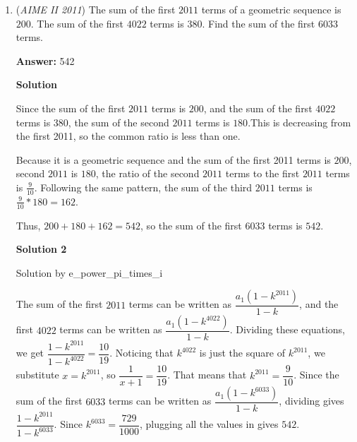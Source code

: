 \begin{enumerate}
 $\frac{AC}{CD} = \frac{AB}{BD}$ $\rightarrow$ $\frac{CD}{BD} = \frac{11}{20}$ $\rightarrow$ $\frac{BC}{BD} = \frac{31}{20}$

 So, from our Menelaus' equation: $\frac{PA}{CP} = \frac{20}{31}$ $\rightarrow$ $m + n = 20 + 31 = \boxed{051}$.

 


 


	\item (\textit{AIME II 2011}) The sum of the first $2011$ terms of a geometric sequence is $200$. The sum of the first $4022$ terms is $380$. Find the sum of the first $6033$ terms. 


 
 \textbf{Answer: }542



\textbf{Solution}

Since the sum of the first $2011$ terms is $200$, and the sum of the first $4022$ terms is $380$, the sum of the second $2011$ terms is $180$.This is decreasing from the first 2011, so the common ratio is less than one.

 Because it is a geometric sequence and the sum of the first 2011 terms is $200$, second $2011$ is $180$, the ratio of the second $2011$ terms to the first $2011$ terms is $\frac{9}{10}$. Following the same pattern, the sum of the third $2011$ terms is $\frac{9}{10}*180 = 162$.

 Thus, $200+180+162=542$, so the sum of the first $6033$ terms is $\boxed{542}$.

 



\textbf{Solution 2}

Solution by e\_power\_pi\_times\_i

 The sum of the first $2011$ terms can be written as $\dfrac{a_1(1-k^{2011})}{1-k}$, and the first $4022$ terms can be written as $\dfrac{a_1(1-k^{4022})}{1-k}$. Dividing these equations, we get $\dfrac{1-k^{2011}}{1-k^{4022}} = \dfrac{10}{19}$. Noticing that $k^{4022}$ is just the square of $k^{2011}$, we substitute $x = k^{2011}$, so $\dfrac{1}{x+1} = \dfrac{10}{19}$. That means that $k^{2011} = \dfrac{9}{10}$. Since the sum of the first $6033$ terms can be written as $\dfrac{a_1(1-k^{6033})}{1-k}$, dividing gives $\dfrac{1-k^{2011}}{1-k^{6033}}$. Since $k^{6033} = \dfrac{729}{1000}$, plugging all the values in gives $\boxed{542}$.

 




\end{enumerate}
